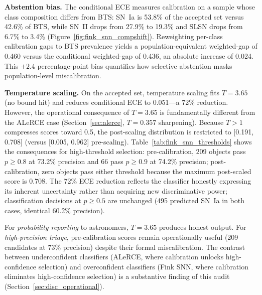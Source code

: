 \documentclass[twocolumn]{aastex631}
\begin{document}
\textbf{Abstention bias.} The conditional ECE measures calibration on a sample whose class composition differs from BTS: SN~Ia is 53.8\% of the accepted set versus 42.6\% of BTS, while SN~II drops from 27.9\% to 19.3\% and SLSN drops from 6.7\% to 3.4\% (Figure~\ref{fig:fink_snn_compshift}). Reweighting per-class calibration gaps to BTS prevalence yields a population-equivalent weighted-gap of 0.460 versus the conditional weighted-gap of 0.436, an absolute increase of 0.024. This $+2.4$ percentage-point bias quantifies how selective abstention masks population-level miscalibration.

\textbf{Temperature scaling.} On the accepted set, temperature scaling fits $T = 3.65$ (no bound hit) and reduces conditional ECE to 0.051---a 72\% reduction. However, the operational consequence of $T = 3.65$ is fundamentally different from the ALeRCE case (Section~\ref{sec:alerce}, $T = 0.357$ sharpening). Because $T > 1$ compresses scores toward 0.5, the post-scaling distribution is restricted to [0.191, 0.708] (versus [0.005, 0.962] pre-scaling). Table~\ref{tab:fink_snn_thresholds} shows the consequences for high-threshold selection: pre-calibration, 209 objects pass $p \ge 0.8$ at 73.2\% precision and 66 pass $p \ge 0.9$ at 74.2\% precision; post-calibration, zero objects pass either threshold because the maximum post-scaled score is 0.708. The 72\% ECE reduction reflects the classifier honestly expressing its inherent uncertainty rather than acquiring new discriminative power; classification decisions at $p \ge 0.5$ are unchanged (495 predicted SN~Ia in both cases, identical 60.2\% precision).

For \emph{probability reporting} to astronomers, $T = 3.65$ produces honest output. For \emph{high-precision triage}, pre-calibration scores remain operationally useful (209 candidates at 73\% precision) despite their formal miscalibration. The contrast between underconfident classifiers (ALeRCE, where calibration unlocks high-confidence selection) and overconfident classifiers (Fink SNN, where calibration eliminates high-confidence selection) is a substantive finding of this audit (Section~\ref{sec:disc_operational}).
\end{document}
